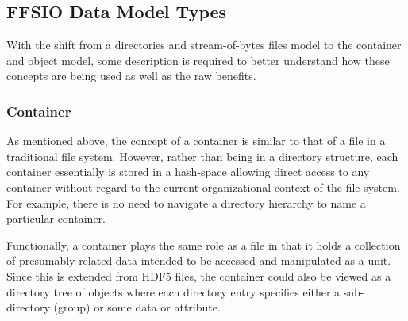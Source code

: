 \documentclass[conference]{IEEEtran}
\begin{document}
%
%
%
%

\subsection{FFSIO Data Model Types}
\label{sec:data-model}

With the shift from a directories and stream-of-bytes files model to the
container and object model, some description is required to better understand
how these concepts are being used as well as the raw benefits.

\subsubsection{Container}
As mentioned above, the concept of a container is similar to that of a file in
a traditional file system. However, rather than being in a directory structure,
each container essentially is stored in a hash-space allowing direct access to
any container without regard to the current organizational context of the
file system. For example, there is no need to navigate a directory hierarchy
to name a particular container.

Functionally, a container plays the same role as a file in that it holds a
collection of presumably related data intended to be accessed and manipulated
as a unit. Since this is extended from HDF5 files, the container could also be
viewed as a directory tree of objects where each directory entry specifies
either a sub-directory (group) or some data or attribute.
\end{document}
